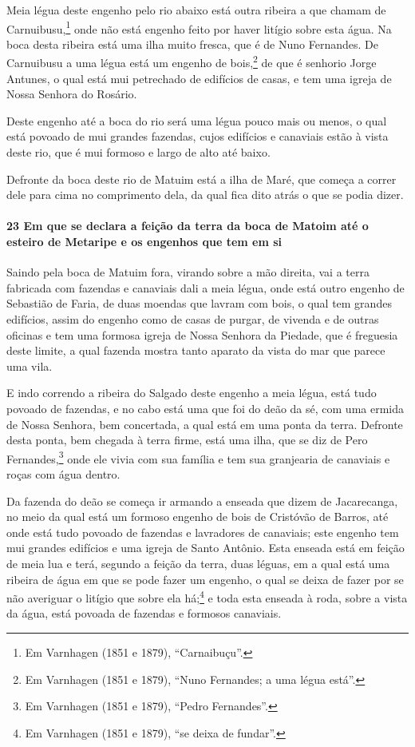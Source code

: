 \begin{linenumbers}
Meia légua deste engenho pelo rio abaixo está outra ribeira a que chamam de
Carnuibusu,\footnote{ Em Varnhagen (1851 e 1879), ``Carnaibuçu''.} onde não está engenho
feito por haver litígio sobre esta água. Na boca desta ribeira está uma ilha muito fresca,
que é de Nuno Fernandes. De Carnuibusu a uma légua está um engenho de bois,\footnote{ Em
Varnhagen (1851 e 1879), ``Nuno Fernandes; a uma légua está''.} de que é senhorio Jorge
Antunes, o qual está mui petrechado de edifícios de casas, e tem uma igreja de Nossa
Senhora do Rosário.

Deste engenho até a boca do rio será uma légua pouco mais ou menos, o qual está povoado de
mui grandes fazendas, cujos edifícios e canaviais estão à vista deste rio, que é mui
formoso e largo de alto até baixo.

Defronte da boca deste rio de Matuim está a ilha de Maré, que começa a correr dele para
cima no comprimento dela, da qual fica dito atrás o que se podia dizer.

\paragraph{23 Em que se declara a feição da terra da boca de Matoim até o esteiro de
Metaripe e os engenhos que tem em si}\quad
Saindo pela boca de Matuim fora, virando sobre a mão direita, vai a terra fabricada com
fazendas e canaviais dali a meia légua, onde está outro engenho de Sebastião de Faria, de
duas moendas que lavram com bois, o qual tem grandes edifícios, assim do engenho como de
casas de purgar, de vivenda e de outras oficinas e tem uma formosa igreja de Nossa Senhora
da Piedade, que é freguesia deste limite, a qual fazenda mostra tanto aparato da vista do
mar que parece uma vila.

E indo correndo a ribeira do Salgado deste engenho a meia légua, está tudo povoado de
fazendas, e no cabo está uma que foi do deão da sé, com uma ermida de Nossa Senhora, bem
concertada, a qual está em uma ponta da terra. Defronte desta ponta, bem chegada à terra
firme, está uma ilha, que se diz de Pero Fernandes,\footnote{ Em Varnhagen (1851 e 1879),
``Pedro Fernandes''.} onde ele vivia com sua família e tem sua granjearia de canaviais e
roças com água dentro.

Da fazenda do deão se começa ir armando a enseada que dizem de Jacarecanga, no meio da
qual está um formoso engenho de bois de Cristóvão de Barros, até onde está tudo povoado de
fazendas e lavradores de canaviais; este engenho tem mui grandes edifícios e uma igreja de
Santo Antônio. Esta enseada está em feição de meia lua e terá, segundo a feição da terra,
duas léguas, em a qual está uma ribeira de água em que se pode fazer um engenho, o qual se
deixa de fazer por se não averiguar o litígio que sobre ela há;\footnote{ Em Varnhagen
(1851 e 1879), ``se deixa de fundar''.} e toda esta enseada à roda, sobre a vista da água,
está povoada de fazendas e formosos canaviais.


\end{linenumbers}
